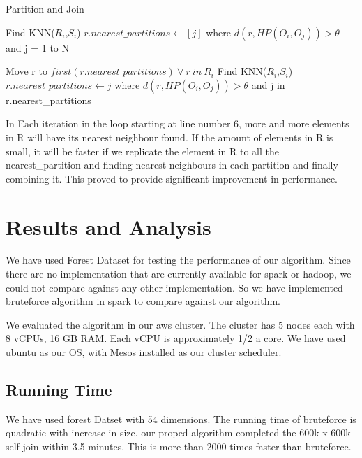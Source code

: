 \documentclass[conference]{IEEEtran}
\begin{document}
\begin{algorithm}
\caption{Partition and Join}
\label{algo_join}
\begin{algorithmic}[1]

\STATE Find KNN($R_i$,$S_i$)
\STATE $r.nearest\_partitions \leftarrow [j]$
\STATE where $d(r, HP(O_i, O_j)) > \theta$ and j = 1 to N
\ENDFOR

\STATE Move r to $first(r.nearest\_partitions)\ \forall\ r\ in\ R_i$
\REPEAT
\STATE Find KNN($R_i$,$S_i$)
\STATE $r.nearest\_partitions \leftarrow j$
\STATE where $d(r, HP(O_i, O_j)) > \theta$  and j in r.nearest\_partitions
\ENDFOR
{}

\end{algorithmic}
\end{algorithm}

\bigskip

In Each iteration in the loop starting at line number 6, more and more elements in R will have its nearest
neighbour found. If the amount of elements in R is small, it will be
faster if we replicate the element in R to all the nearest\_partition
and finding nearest neighbours in each partition and finally combining
it. This proved to provide significant improvement in performance.

\bigskip

\section{Results and Analysis}

We have used Forest Dataset for testing the performance of our
algorithm. Since there are no implementation that are currently
available for spark or hadoop, we could not compare against any other
implementation. So we have implemented bruteforce algorithm in spark to
compare against our algorithm.

We evaluated the algorithm in our aws cluster. The cluster has 5 nodes
each with 8 vCPUs, 16 GB RAM. Each vCPU is approximately 1/2 a
core. We have used ubuntu as our OS, with Mesos installed as our
cluster scheduler.

\subsection{Running Time}

We have used forest Datset with 54 dimensions. The running time of
bruteforce is quadratic with increase in size.
our proped algorithm completed the 600k x 600k self join within 3.5
minutes. This is more than 2000 times faster than bruteforce.
\end{document}
